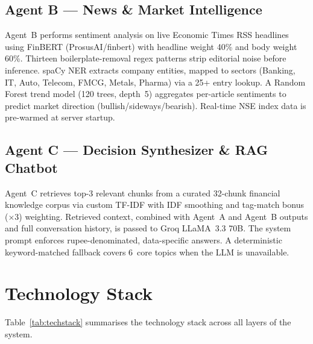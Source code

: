 \documentclass[conference]{IEEEtran}
\begin{document}
\subsection{Agent B --- News \& Market Intelligence}

Agent~B performs sentiment analysis on live Economic Times RSS headlines using FinBERT (ProsusAI/finbert) with headline weight 40\% and body weight 60\%. Thirteen boilerplate-removal regex patterns strip editorial noise before inference. spaCy NER extracts company entities, mapped to sectors (Banking, IT, Auto, Telecom, FMCG, Metals, Pharma) via a 25+ entry lookup. A Random Forest trend model (120 trees, depth~5) aggregates per-article sentiments to predict market direction (bullish/sideways/bearish). Real-time NSE index data is pre-warmed at server startup.

\subsection{Agent C --- Decision Synthesizer \& RAG Chatbot}

Agent~C retrieves top-3 relevant chunks from a curated 32-chunk financial knowledge corpus via custom TF-IDF with IDF smoothing and tag-match bonus ($\times 3$) weighting. Retrieved context, combined with Agent~A and Agent~B outputs and full conversation history, is passed to Groq LLaMA~3.3 70B. The system prompt enforces rupee-denominated, data-specific answers. A deterministic keyword-matched fallback covers 6~core topics when the LLM is unavailable.

\section{Technology Stack}

Table~\ref{tab:techstack} summarises the technology stack across all layers of the system.
\end{document}
